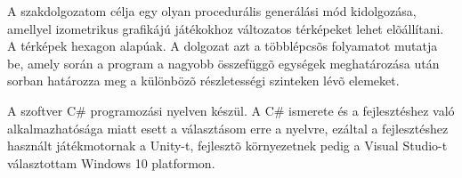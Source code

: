 
A szakdolgozatom célja egy olyan procedurális generálási mód kidolgozása, amellyel izometrikus grafikájú játékokhoz változatos térképeket lehet elõállítani. A térképek hexagon alapúak. A dolgozat azt a többlépcsõs folyamatot mutatja be, amely során a program a nagyobb összefüggõ egységek meghatározása után sorban határozza meg a különbözõ részletességi szinteken lévõ elemeket.

A szoftver C# programozási nyelven készül. A C# ismerete és a fejlesztéshez való alkalmazhatósága miatt esett a választásom erre a nyelvre, ezáltal a fejlesztéshez használt játékmotornak a Unity-t, fejlesztõ környezetnek pedig a Visual Studio-t választottam Windows 10 platformon.


